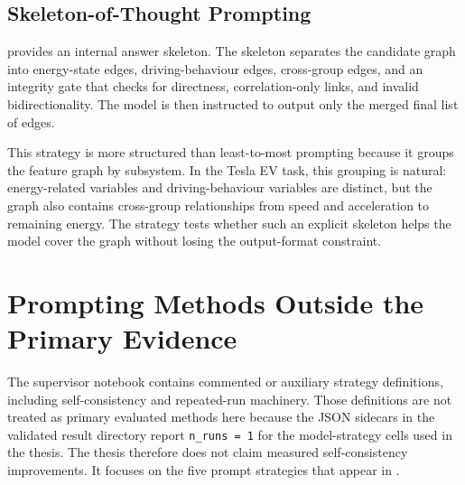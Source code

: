 \subsection{Skeleton-of-Thought Prompting}

 provides an internal answer
skeleton. The skeleton separates the candidate graph into energy-state edges,
driving-behaviour edges, cross-group edges, and an integrity gate that checks
for directness, correlation-only links, and invalid bidirectionality. The
model is then instructed to output only the merged final list of edges.

This strategy is more structured than least-to-most prompting because it
groups the feature graph by subsystem. In the Tesla EV task, this grouping is
natural: energy-related variables and driving-behaviour variables are
distinct, but the graph also contains cross-group relationships from speed and
acceleration to remaining energy. The strategy tests whether such an explicit
skeleton helps the model cover the graph without losing the output-format
constraint.

\section{Prompting Methods Outside the Primary Evidence}

The supervisor notebook contains commented or auxiliary strategy definitions,
including self-consistency and repeated-run machinery. Those definitions are
not treated as primary evaluated methods here because the JSON sidecars in the
validated result directory report \texttt{n\_runs = 1} for the model-strategy
cells used in the thesis. The thesis therefore does not claim measured
self-consistency improvements. It focuses on the five prompt strategies that
appear in .
